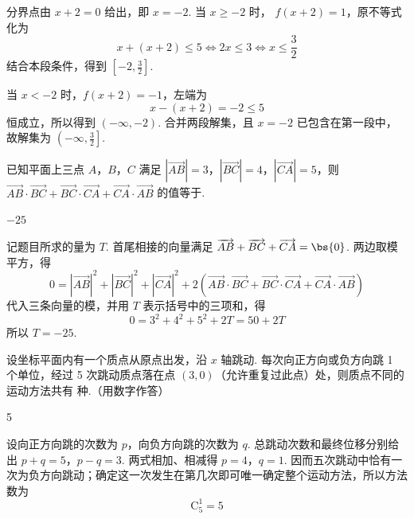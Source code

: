 \begin{solution}
分界点由 \(x+2=0\) 给出，即 \(x=-2\). 当 \(x\geqslant-2\) 时，
\(f(x+2)=1\)，原不等式化为
\[
x+(x+2)\leqslant5\iff 2x\leqslant3\iff x\leqslant\frac32
\]
结合本段条件，得到 \(\left[-2,\frac32\right]\).

当 \(x<-2\) 时，\(f(x+2)=-1\)，左端为
\[
x-(x+2)=-2\leqslant5
\]
恒成立，所以得到 \((-\infty,-2)\). 合并两段解集，且 \(x=-2\) 已包含在第一段中，故解集为
\(\left(-\infty,\frac32\right]\).
\end{solution}

\begin{problem}
已知平面上三点 \(A\)，\(B\)，\(C\) 满足 \(\left|\overrightarrow{AB}\right|=3\)，\(\left|\overrightarrow{BC}\right|=4\)，\(\left|\overrightarrow{CA}\right|=5\)，则 \(\overrightarrow{AB}\cdot\overrightarrow{BC}+\overrightarrow{BC}\cdot\overrightarrow{CA}+\overrightarrow{CA}\cdot\overrightarrow{AB}\) 的值等于\fillinblank{}.
\end{problem}

\begin{answer}
\(-25\)
\end{answer}

\begin{solution}
记题目所求的量为 \(T\). 首尾相接的向量满足
\(\overrightarrow{AB}+\overrightarrow{BC}+\overrightarrow{CA}=\bs{0}\). 两边取模平方，得
\[
0=|\overrightarrow{AB}|^2+|\overrightarrow{BC}|^2+|\overrightarrow{CA}|^2
  +2\left(\overrightarrow{AB}\cdot\overrightarrow{BC}
  +\overrightarrow{BC}\cdot\overrightarrow{CA}
  +\overrightarrow{CA}\cdot\overrightarrow{AB}\right)
\]
代入三条向量的模，并用 \(T\) 表示括号中的三项和，得
\[
0=3^2+4^2+5^2+2T=50+2T
\]
所以 \(T=-25\).
\end{solution}

\begin{problem}
设坐标平面内有一个质点从原点出发，沿 \(x\) 轴跳动. 每次向正方向或负方向跳 1 个单位，经过 5 次跳动质点落在点 \((3,0)\)（允许重复过此点）处，则质点不同的运动方法共有\fillinblank{} 种.（用数字作答）
\end{problem}

\begin{answer}
5
\end{answer}

\begin{solution}
设向正方向跳的次数为 \(p\)，向负方向跳的次数为 \(q\). 总跳动次数和最终位移分别给出
\(p+q=5\)，\(p-q=3\).
两式相加、相减得 \(p=4\)，\(q=1\). 因而五次跳动中恰有一次为负方向跳动；确定这一次发生在第几次即可唯一确定整个运动方法，所以方法数为
\[
\mathrm C_5^1=5
\]
\end{solution}

